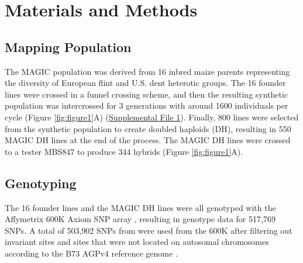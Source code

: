 \documentclass[article,9pt,twocolumn,twoside]{rilabRxiv}
\begin{document}
\section{Materials and Methods}
\label{sec:materials:methods}
\subsection{Mapping Population}
The MAGIC population was derived from 16 inbred maize parents representing the diversity of European flint and U.S. dent heterotic groups.
The 16 founder lines were crossed in a funnel crossing scheme, and then the resulting synthetic population was intercrossed for 3 generations with around 1600 individuals per cycle (Figure \ref{fig:figure1}A) (\href{run:./figures/Methods_Supplementa1.docx}{Supplemental File 1}).
Finally, 800 lines were selected from the synthetic population to create doubled haploids (DH), resulting in 550 MAGIC DH lines at the end of the process.
The MAGIC DH lines were crossed to a tester MBS847 to produce 344 hybrids (Figure \ref{fig:figure1}A).

\subsection{Genotyping}
The 16 founder lines and the MAGIC DH lines were all genotyped with the Affymetrix 600K Axiom SNP array \citep{Unterseer}, resulting in genotype data for 517,769 SNPs.
A  total of 503,902 SNPs from were used from the  600K after filtering out invariant sites and sites that were not located on autosomal chromosomes according to the B73 AGPv4 reference genome \citep{Jiao}.
\end{document}
